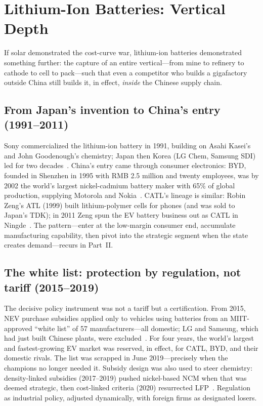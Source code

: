 \chapter{Lithium-Ion Batteries: Vertical Depth}
\label{ch:batteries}

If solar demonstrated the cost-curve war, lithium-ion batteries demonstrated something further: the capture of an entire vertical---from mine to refinery to cathode to cell to pack---such that even a competitor who builds a gigafactory outside China still builds it, in effect, \emph{inside} the Chinese supply chain.

\section{From Japan's invention to China's entry (1991--2011)}

Sony commercialized the lithium-ion battery in 1991, building on Asahi Kasei's and John Goodenough's chemistry; Japan then Korea (LG Chem, Samsung SDI) led for two decades~\cite{sony-1991}. China's entry came through consumer electronics: BYD, founded in Shenzhen in 1995 with RMB 2.5 million and twenty employees, was by 2002 the world's largest nickel-cadmium battery maker with 65\% of global production, supplying Motorola and Nokia~\cite{byd-history}. CATL's lineage is similar: Robin Zeng's ATL (1999) built lithium-polymer cells for phones (and was sold to Japan's TDK); in 2011 Zeng spun the EV battery business out as CATL in Ningde~\cite{catl-history}. The pattern---enter at the low-margin consumer end, accumulate manufacturing capability, then pivot into the strategic segment when the state creates demand---recurs in Part~II.

\section{The white list: protection by regulation, not tariff (2015--2019)}

The decisive policy instrument was not a tariff but a certification. From 2015, NEV purchase subsidies applied only to vehicles using batteries from an MIIT-approved ``white list'' of 57 manufacturers---all domestic; LG and Samsung, which had just built Chinese plants, were excluded~\cite{white-list}. For four years, the world's largest and fastest-growing EV market was reserved, in effect, for CATL, BYD, and their domestic rivals. The list was scrapped in June 2019---precisely when the champions no longer needed it. Subsidy design was also used to steer chemistry: density-linked subsidies (2017--2019) pushed nickel-based NCM when that was deemed strategic, then cost-linked criteria (2020) resurrected LFP~\cite{lfp-story}. Regulation as industrial policy, adjusted dynamically, with foreign firms as designated losers.

